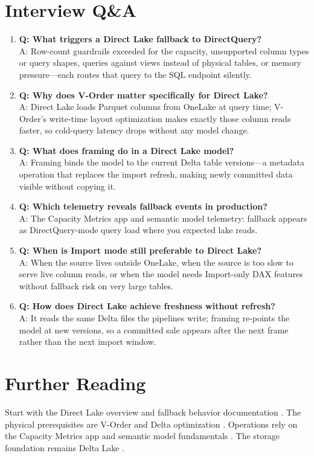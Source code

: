 \section{Interview Q\&A}
\begin{enumerate}
    \item \textbf{Q: What triggers a Direct Lake fallback to DirectQuery?}\\
    A: Row-count guardrails exceeded for the capacity, unsupported column types or query shapes, queries against views instead of physical tables, or memory pressure---each routes that query to the SQL endpoint silently.
    \item \textbf{Q: Why does V-Order matter specifically for Direct Lake?}\\
    A: Direct Lake loads Parquet columns from OneLake at query time; V-Order's write-time layout optimization makes exactly those column reads faster, so cold-query latency drops without any model change.
    \item \textbf{Q: What does framing do in a Direct Lake model?}\\
    A: Framing binds the model to the current Delta table versions---a metadata operation that replaces the import refresh, making newly committed data visible without copying it.
    \item \textbf{Q: Which telemetry reveals fallback events in production?}\\
    A: The Capacity Metrics app and semantic model telemetry: fallback appears as DirectQuery-mode query load where you expected lake reads.
    \item \textbf{Q: When is Import mode still preferable to Direct Lake?}\\
    A: When the source lives outside OneLake, when the source is too slow to serve live column reads, or when the model needs Import-only DAX features without fallback risk on very large tables.
    \item \textbf{Q: How does Direct Lake achieve freshness without refresh?}\\
    A: It reads the same Delta files the pipelines write; framing re-points the model at new versions, so a committed sale appears after the next frame rather than the next import window.
\end{enumerate}

\section{Further Reading}
Start with the Direct Lake overview \cite{microsoftDirectLake} and fallback behavior documentation \cite{microsoftFabricDirectLakeFallback}. The physical prerequisites are V-Order \cite{microsoftFabricVOrder} and Delta optimization \cite{microsoftFabricOptimize}. Operations rely on the Capacity Metrics app \cite{microsoftFabricMetricsApp} and semantic model fundamentals \cite{microsoftFabricSemanticModels}. The storage foundation remains Delta Lake \cite{deltaLakeDocs,armbrust2020delta}.

